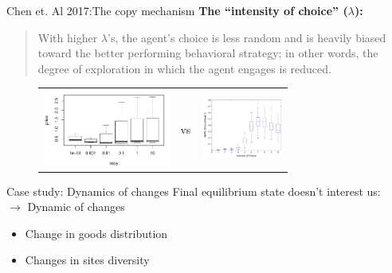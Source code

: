 \documentclass[12pt, notes=show]{beamer}
\begin{document}
\begin{frame}{Chen et. Al 2017:The copy mechanism}
    \textbf{ The ``intensity of choice'' ($\lambda$):}
    \begin{quote}
	\tiny
	 With higher $\lambda$'s, the agent’s choice is less random and is heavily
	 biased toward the better performing behavioral strategy; in other words, the degree of
	 exploration in which the agent engages is reduced. 
    \end{quote}
    \begin{figure}[htp]
	\begin{center}
	\begin{tabular}{m{4cm}cm{4cm}}
	   \includegraphics[height=2.5cm]{../images/PriceCopyAll.pdf} & vs  &
	     \includegraphics[height=2cm]{../images/chenetal_fig7.png} \\
	     \end{tabular}
	\end{center}
    \end{figure}
\end{frame}
\begin{frame}{Case study: Dynamics of changes}
    Final equilibrium state doesn't interest us:\\

    {\centering $\rightarrow$ Dynamic of changes}

   
    \begin{itemize}
	\item Change in goods distribution
	\item Changes in sites diversity
    \end{itemize}
    
\end{frame}
\end{document}
